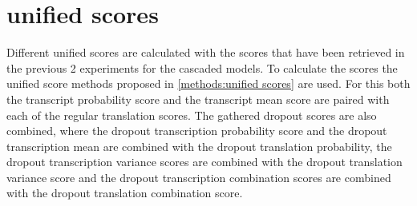\section{unified scores}
Different unified scores are calculated with the scores that have been retrieved in the previous 2 experiments for the cascaded models. To calculate the scores the unified score methods proposed in \autoref{methods:unified scores} are used. 
For this both the transcript probability score and the transcript mean score are paired with each of the regular translation scores. 
The gathered dropout scores are also combined, where the dropout transcription probability score and the dropout transcription mean are combined with the dropout translation probability, the dropout transcription variance scores are combined with the dropout translation variance score and the dropout transcription combination scores are combined with the dropout translation combination score.
